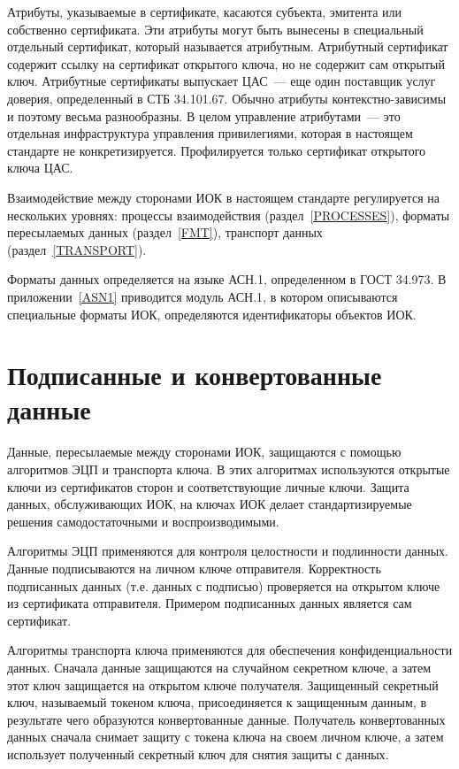 Атрибуты, указываемые в сертификате, касаются субъекта, эмитента или 
собственно сертификата. Эти атрибуты могут быть вынесены в специальный 
отдельный сертификат, который называется атрибутным. Атрибутный  
сертификат содержит ссылку на сертификат открытого ключа, 
но не содержит сам открытый ключ. 
Атрибутные сертификаты выпускает ЦАС~--- еще один поставщик услуг доверия, 
определенный в СТБ 34.101.67. Обычно атрибуты контекстно-зависимы и поэтому 
весьма разнообразны. В целом управление атрибутами~---  
это отдельная  инфраструктура управления привилегиями, которая в настоящем 
стандарте не конкретизируется. Профилируется только сертификат открытого 
ключа ЦАС.

Взаимодействие между сторонами ИОК в настоящем стандарте регулируется на 
нескольких уровнях: процессы взаимодействия (раздел~\ref{PROCESSES}), 
форматы пересылаемых данных (раздел~\ref{FMT}), 
транспорт данных (раздел~\ref{TRANSPORT}).

Форматы данных определяется на языке АСН.1, определенном в ГОСТ 34.973.
В приложении~\ref{ASN1} приводится модуль АСН.1, в котором описываются
специальные форматы ИОК, определяются идентификаторы объектов ИОК.

\section{Подписанные и конвертованные данные}

Данные, пересылаемые между сторонами ИОК, защищаются с помощью 
алгоритмов ЭЦП и транспорта ключа. В этих алгоритмах используются
открытые ключи из сертификатов сторон и соответствующие личные ключи.
%
Защита данных, обслуживающих ИОК, на ключах ИОК делает 
стандартизируемые решения самодостаточными и воспроизводимыми.

Алгоритмы ЭЦП применяются для контроля целостности и подлинности данных.
Данные подписываются на личном ключе отправителя. Корректность подписанных 
данных (т.е. данных с подписью) проверяется на открытом ключе из 
сертификата отправителя. Примером подписанных данных является сам сертификат. 

Алгоритмы транспорта ключа применяются для обеспечения конфиденциальности 
данных. Сначала данные защищаются на случайном секретном ключе, а затем 
этот ключ защищается на открытом ключе получателя. 
Защищенный секретный ключ, называемый токеном ключа, присоединяется к защищенным данным,
в результате чего образуются конвертованные данные. 
Получатель конвертованных данных сначала снимает защиту с токена ключа на своем 
личном ключе, а затем использует полученный секретный ключ для снятия 
защиты с данных.  

